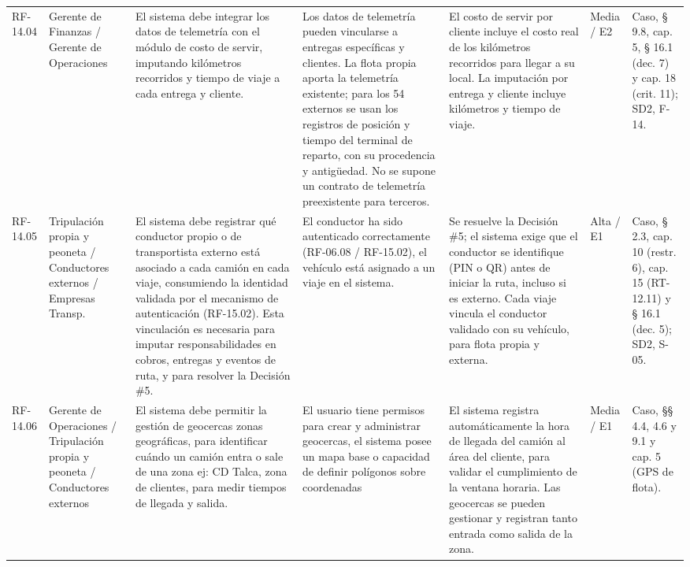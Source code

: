 {\begin{longtable}{@{}F{0.062} F{0.080} F{0.195} F{0.160} F{0.240} F{0.093} F{0.170}@{}}
  RF-14.04 & Gerente de Finanzas / Gerente de Operaciones & El sistema debe integrar los datos de telemetría con el módulo de costo de servir, imputando kilómetros recorridos y tiempo de viaje a cada entrega y cliente. & Los datos de telemetría pueden vincularse a entregas específicas y clientes. La flota propia aporta la telemetría existente; para los 54 externos se usan los registros de posición y tiempo del terminal de reparto, con su procedencia y antigüedad. No se supone un contrato de telemetría preexistente para terceros. & El costo de servir por cliente incluye el costo real de los kilómetros recorridos para llegar a su local. La imputación por entrega y cliente incluye kilómetros y tiempo de viaje. & Media / E2 & Caso, § 9.8, cap. 5, § 16.1 (dec. 7) y cap. 18 (crit. 11); SD2, F-14. \\
  RF-14.05 & Tripulación propia y peoneta / Conductores externos / Empresas Transp. & El sistema debe registrar qué conductor propio o de transportista externo está asociado a cada camión en cada viaje, consumiendo la identidad validada por el mecanismo de autenticación (RF-15.02). Esta vinculación es necesaria para imputar responsabilidades en cobros, entregas y eventos de ruta, y para resolver la Decisión \#5. & El conductor ha sido autenticado correctamente (RF-06.08 / RF-15.02), el vehículo está asignado a un viaje en el sistema. & Se resuelve la Decisión \#5; el sistema exige que el conductor se identifique (PIN o QR) antes de iniciar la ruta, incluso si es externo. Cada viaje vincula el conductor validado con su vehículo, para flota propia y externa. & Alta / E1 & Caso, § 2.3, cap. 10 (restr. 6), cap. 15 (RT-12.11) y § 16.1 (dec. 5); SD2, S-05. \\
  RF-14.06 & Gerente de Operaciones / Tripulación propia y peoneta / Conductores externos & El sistema debe permitir la gestión de geocercas zonas geográficas, para identificar cuándo un camión entra o sale de una zona ej: CD Talca, zona de clientes, para medir tiempos de llegada y salida. & El usuario tiene permisos para crear y administrar geocercas, el sistema posee un mapa base o capacidad de definir polígonos sobre coordenadas & El sistema registra automáticamente la hora de llegada del camión al área del cliente, para validar el cumplimiento de la ventana horaria. Las geocercas se pueden gestionar y registran tanto entrada como salida de la zona. & Media / E1 & Caso, §§ 4.4, 4.6 y 9.1 y cap. 5 (GPS de flota). \\
\end{longtable}}
